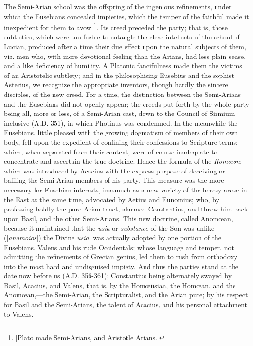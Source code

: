 The Semi-Arian school was the offspring of the ingenious
refinements, under which the Eusebians concealed impieties, which the
temper of the faithful made it inexpedient for them to avow \footnote{[Plato made Semi-Arians, and Aristotle Arians.]}. Its creed preceded the party; that is, those subtleties, which
were too feeble to entangle the clear intellects of the school of
Lucian, produced after a time their due effect upon the natural
subjects of them, viz. men who, with more devotional feeling than the
Arians, had less plain sense, and a like deficiency of humility. A
Platonic fancifulness made them the victims of an Aristotelic
subtlety; and in the philosophising Eusebius and the sophist Asterius,
we recognize the appropriate inventors, though hardly the sincere
disciples, of the new creed. For a time, the distinction between the
Semi-Arians and the Eusebians did not openly appear; the creeds
put forth by the whole party being all, more or less, of a Semi-Arian
cast, down to the Council of Sirmium inclusive (A.D.
351), in which Photinus was condemned. In the meanwhile the Eusebians,
little pleased with the growing dogmatism of members of their own
body, fell upon the expedient of confining their confessions to
Scripture terms; which, when separated from their context, were of
course inadequate to concentrate and ascertain the true doctrine.
Hence the formula of the \emph{Homœon}; which was introduced by
Acacius with the express purpose of deceiving or baffling the
Semi-Arian members of his party. This measure was the more necessary
for Eusebian interests, inasmuch as a new variety of the heresy arose
in the East at the same time, advocated by Aetius and Eunomius; who,
by professing boldly the pure Arian tenet, alarmed Constantius, and
threw him back upon Basil, and the other Semi-Arians. This new
doctrine, called Anomœan, because it maintained that the \emph{usia}
or \emph{substance} of the Son was unlike ([\emph{anomoios}]) the
Divine \emph{usia}, was actually adopted by one portion of the
Eusebians, Valens and his rude Occidentals; whose language and temper,
not admitting the refinements of Grecian genius, led them to rush from
orthodoxy into the most hard and undisguised impiety. And thus the
parties stand at the date now before us (A.D.
356-361); Constantius being alternately swayed by Basil, Acacius, and
Valens, that is, by the Homœüsian, the Homœan, and the Anomœan,—the
Semi-Arian, the Scripturalist, and the Arian pure; by his respect for
Basil and the Semi-Arians, the talent of Acacius, and his personal
attachment to Valens.

